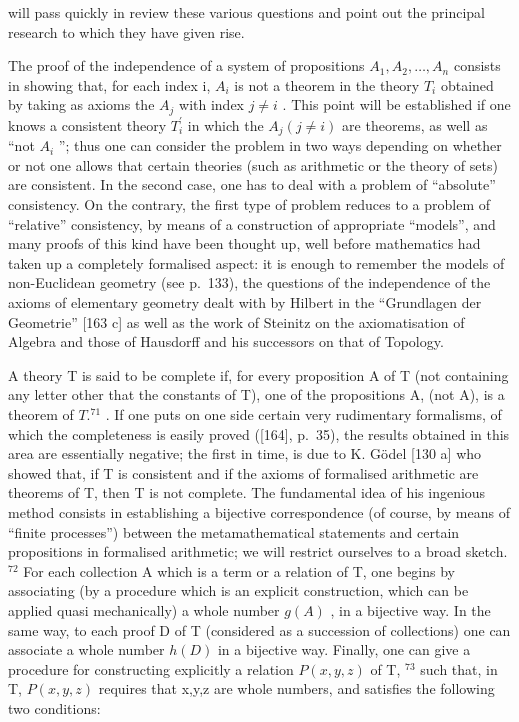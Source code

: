 will pass quickly in review these various questions and point out the principal research to which they have given rise.

The proof of the independence of a system of propositions \(A_{1}, A_{2}, \ldots, A_{n}\) consists in showing that, for each index i, \(A_{i}\) is not a theorem in the theory \(T_{i}\) obtained by taking as axioms the \(A_{j}\) with index \(j \neq i\) . This point will be established if one knows a consistent theory \(T_{i}^{\prime}\) in which the \(A_{j}(j \neq i)\) are theorems, as well as ``not \(A_{i}\) ''; thus one can consider the problem in two ways depending on whether or not one allows that certain theories (such as arithmetic or the theory of sets) are consistent. In the second case, one has to deal with a problem of ``absolute'' consistency. On the contrary, the first type of problem reduces to a problem of ``relative'' consistency, by means of a construction of appropriate ``models'', and many proofs of this kind have been thought up, well before mathematics had taken up a completely formalised aspect: it is enough to remember the models of non-Euclidean geometry (see p.~133), the questions of the independence of the axioms of elementary geometry dealt with by Hilbert in the ``Grundlagen der Geometrie'' {[}163 c{]} as well as the work of Steinitz on the axiomatisation of Algebra and those of Hausdorff and his successors on that of Topology.

A theory T is said to be complete if, for every proposition A of T (not containing any letter other that the constants of T), one of the propositions A, (not A), is a theorem of \(T.^{71}\) . If one puts on one side certain very rudimentary formalisms, of which the completeness is easily proved ({[}164{]}, p.~35), the results obtained in this area are essentially negative; the first in time, is due to K. Gödel {[}130 a{]} who showed that, if T is consistent and if the axioms of formalised arithmetic are theorems of T, then T is not complete. The fundamental idea of his ingenious method consists in establishing a bijective correspondence (of course, by means of ``finite processes'') between the metamathematical statements and certain propositions in formalised arithmetic; we will restrict ourselves to a broad sketch. \(^{72}\) For each collection A which is a term or a relation of T, one begins by associating (by a procedure which is an explicit construction, which can be applied quasi mechanically) a whole number \(g(A)\) , in a bijective way. In the same way, to each proof D of T (considered as a succession of collections) one can associate a whole number \(h(D)\) in a bijective way. Finally, one can give a procedure for constructing explicitly a relation \(P(x,y,z)\) of T, \(^{73}\) such that, in T, \(P(x,y,z)\) requires that x,y,z are whole numbers, and satisfies the following two conditions:

